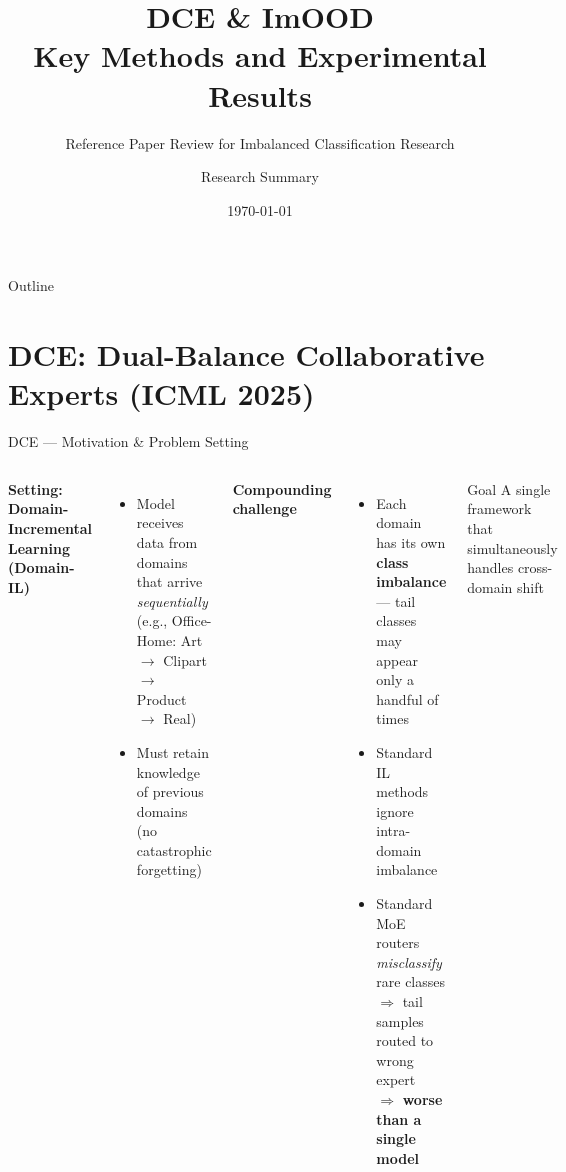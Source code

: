 \documentclass[aspectratio=169,10pt]{beamer}
\title[DCE \& ImOOD Paper Review]{DCE \& ImOOD\\
  Key Methods and Experimental Results}
\subtitle{Reference Paper Review for Imbalanced Classification Research}
\author{Research Summary}
\institute{Network Security \& Class Imbalance Project}
\date{\today}
\begin{document}

\begin{frame}
  \titlepage
\end{frame}

\begin{frame}{Outline}
  \tableofcontents
\end{frame}

\section{DCE: Dual-Balance Collaborative Experts (ICML 2025)}

\begin{frame}{DCE --- Motivation \& Problem Setting}
  \begin{columns}[T]
      \textbf{Setting: Domain-Incremental Learning (Domain-IL)}
      \begin{itemize}
        \item Model receives data from domains that arrive \emph{sequentially}\\
              (e.g., Office-Home: Art $\to$ Clipart $\to$ Product $\to$ Real)
        \item Must retain knowledge of previous domains (no catastrophic forgetting)
      \end{itemize}
      \vspace{6pt}
      \textbf{Compounding challenge}
      \begin{itemize}
        \item Each domain has its own \textbf{class imbalance}---
              tail classes may appear only a handful of times
        \item Standard IL methods ignore intra-domain imbalance
        \item Standard MoE routers \emph{misclassify} rare classes\\
              $\Rightarrow$ tail samples routed to wrong expert\\
              $\Rightarrow$ \textbf{worse than a single model}
      \end{itemize}
      \vspace{4pt}
      \begin{block}{Goal}
        A single framework that simultaneously handles cross-domain shift

\end{block}
\end{columns}
\end{frame}
\end{document}
